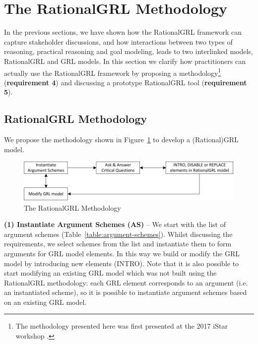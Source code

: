 \section{The RationalGRL Methodology}
\label{sect:methodology}

In the previous sections, we have shown how the RationalGRL framework can capture stakeholder discussions, and how interactions between two types of reasoning, practical reasoning and goal modeling, leads to two interlinked models, RationalGRL and GRL models. In this section we clarify how practitioners can actually use the RationalGRL framework by proposing a methodology\footnote{The methodology presented here was first presented at the 2017 iStar workshop \cite{iSTar}.} (\textbf{requirement 4}) and discussing a prototype RationalGRL tool (\textbf{requirement 5}).

\subsection{RationalGRL Methodology}
\label{sect:methodology} 

We propose the methodology shown in Figure~\ref{fig:rationalgrl-methodology} to develop a (Rational)GRL model. %

\begin{figure}[ht]
\centering
\includegraphics{img/methodology.pdf}
\caption{The RationalGRL Methodology}
\label{fig:rationalgrl-methodology}
\end{figure}

\textbf{(1) Instantiate Argument Schemes (AS)} -- We start with the list of argument schemes (Table~\ref{table:argument-schemes}). Whilst discussing the requirements, we select schemes from the list and instantiate them to form arguments for GRL model elements. In this way we build or modify the GRL model by introducing new elements (\textsf{INTRO}). Note that it is also possible to start modifying an existing GRL model which was not built using the RationalGRL methodology: each GRL element corresponds to an argument (i.e. an instantiated scheme), so it is possible to instantiate argument schemes based on an existing GRL model. 

